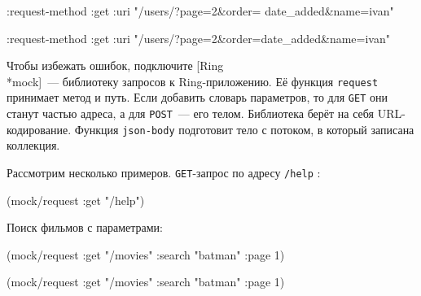 \begin{english}
  \begin{clojure}
{:request-method :get
 :uri
 "/users/?page=2&order=
                 date_added&name=ivan"}
  \end{clojure}
\end{english}

\else

\begin{english}
  \begin{clojure}
{:request-method :get
 :uri "/users/?page=2&order=date_added&name=ivan"}
  \end{clojure}
\end{english}

\fi


Чтобы избежать ошибок, подключите
[Ring\\*mock]~---
библиотеку запросов к Ring-при\-ло\-же\-нию. Её функция \verb|request| принимает
метод и путь. Если добавить словарь параметров, то для \verb|GET| они станут
частью адреса, а для \verb|POST|~--- его телом. Библиотека берёт на себя
URL-кодирование. Функция \verb|json-body| подготовит тело с потоком, в который
записана коллекция.

Рассмотрим несколько примеров. \verb|GET|-запрос по адресу \verb|/help| :

\begin{english}
  \begin{clojure}
(mock/request :get "/help")
  \end{clojure}
\end{english}

\noindent
Поиск фильмов с параметрами:

\ifnarrow

\begin{english}
  \begin{clojure}
(mock/request :get "/movies"
  {:search "batman" :page 1})
  \end{clojure}
\end{english}

\else

\ifafive

\begin{english}
  \begin{clojure}
(mock/request :get "/movies"
              {:search "batman" :page 1})
  \end{clojure}
\end{english}

